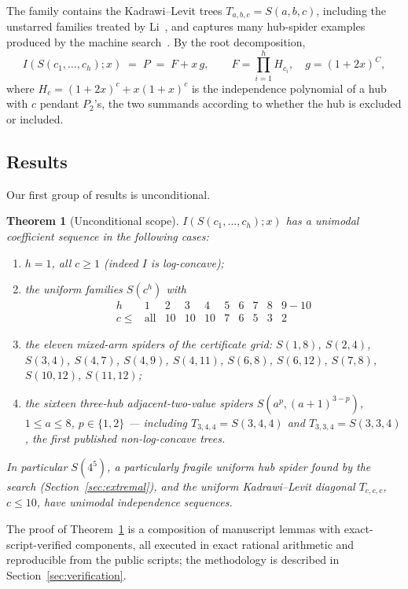 \documentclass[11pt]{article}
\newtheorem{theorem}{Theorem}[section]
\theoremstyle{definition}
\begin{document}
The family contains the Kadrawi--Levit trees $T_{a,b,c}=S(a,b,c)$,
including the unstarred families treated by Li~\cite{Li}, and captures
many hub-spider examples produced by the machine search~\cite{RamosSun}.
By the root
decomposition,
\begin{equation}\label{eq:PFG}
  I(S(c_1,\dots,c_h);x) \;=\; P \;=\; F + x\,g,\qquad
  F=\prod_{i=1}^h H_{c_i},\quad g=(1+2x)^{C},
\end{equation}
where $H_c=(1+2x)^c+x(1+x)^c$ is the independence polynomial of a hub
with $c$ pendant $P_2$'s, the two summands according to whether the hub
is excluded or included.

\subsection{Results}

Our first group of results is unconditional.

\begin{theorem}[Unconditional scope]\label{thm:scope}
$I(S(c_1,\dots,c_h);x)$ has a unimodal coefficient sequence in the
following cases:
\begin{enumerate}
  \item $h=1$, all $c\ge 1$ (indeed $I$ is log-concave);
  \item the uniform families $S(c^h)$ with
    \[
      \begin{array}{c|cccccccccc}
        h & 1 & 2 & 3 & 4 & 5 & 6 & 7 & 8 & 9{-}10\\\hline
        c\le & \text{all} & 10 & 10 & 10 & 7 & 6 & 5 & 3 & 2
      \end{array}
    \]
  \item the eleven mixed-arm spiders of the certificate grid:
    $S(1,8)$, $S(2,4)$, $S(3,4)$, $S(4,7)$, $S(4,9)$, $S(4,11)$,
    $S(6,8)$, $S(6,12)$, $S(7,8)$, $S(10,12)$, $S(11,12)$;
  \item the sixteen three-hub adjacent-two-value spiders
    $S(a^p,(a{+}1)^{3-p})$, $1\le a\le8$, $p\in\{1,2\}$ ---
    including $T_{3,4,4}=S(3,4,4)$ and $T_{3,3,4}=S(3,3,4)$, the
    first published non-log-concave trees.
\end{enumerate}
In particular $S(4^5)$, a particularly fragile uniform hub spider found
by the search (Section~\ref{sec:extremal}), and the uniform Kadrawi--Levit
diagonal $T_{c,c,c}$, $c\le 10$, have unimodal independence sequences.
\end{theorem}

The proof of Theorem~\ref{thm:scope} is a composition of manuscript
lemmas with exact-script-verified components, all executed in exact
rational arithmetic and reproducible from the public scripts; the
methodology is described in Section~\ref{sec:verification}.
\end{document}
